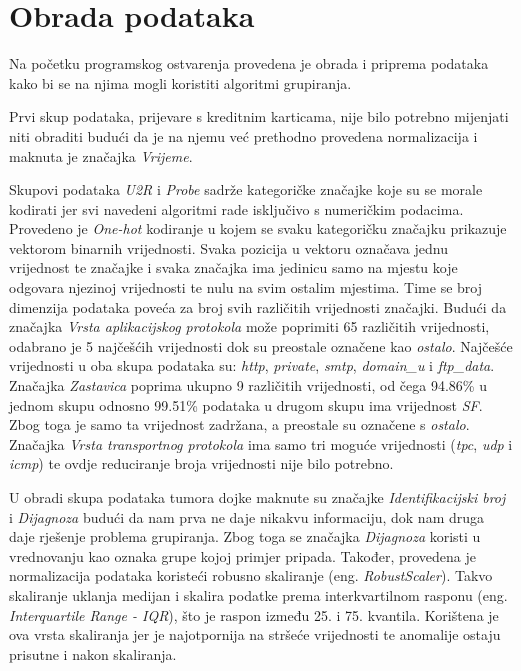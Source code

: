 \documentclass[utf8, diplomski, numeric]{fer}
\begin{document}
\section{Obrada podataka}
Na početku programskog ostvarenja provedena je obrada i priprema podataka kako bi se na njima mogli koristiti algoritmi grupiranja.

Prvi skup podataka, prijevare s kreditnim karticama, nije bilo potrebno mijenjati niti obraditi budući da je na njemu već prethodno provedena normalizacija i maknuta je značajka \textit{Vrijeme}. 

Skupovi podataka \textit{U2R} i \textit{Probe} sadrže kategoričke značajke koje su se morale kodirati jer svi navedeni algoritmi rade isključivo s numeričkim podacima. Provedeno je \textit{One-hot} kodiranje u kojem se svaku kategoričku značajku prikazuje vektorom binarnih vrijednosti. Svaka pozicija u vektoru označava jednu vrijednost te značajke i svaka značajka ima jedinicu samo na mjestu koje odgovara njezinoj vrijednosti te nulu na svim ostalim mjestima. Time se broj dimenzija podataka poveća za broj svih različitih vrijednosti značajki. Budući da značajka \textit{Vrsta aplikacijskog protokola} može poprimiti 65 različitih vrijednosti, odabrano je 5 najčešćih vrijednosti dok su preostale označene kao \textit{ostalo}. Najčešće vrijednosti u oba skupa podataka su: \textit{http}, \textit{private},  \textit{smtp}, \textit{domain\_u}  i \textit{ftp\_data}. Značajka \textit{Zastavica} poprima ukupno 9 različitih vrijednosti, od čega 94.86\% u jednom skupu odnosno 99.51\% podataka u drugom skupu ima vrijednost \textit{SF}. Zbog toga je samo ta vrijednost zadržana, a preostale su označene s \textit{ostalo}. Značajka \textit{Vrsta transportnog protokola} ima samo tri moguće vrijednosti (\textit{tpc}, \textit{udp} i \textit{icmp}) te ovdje reduciranje broja vrijednosti nije bilo potrebno.

U obradi skupa podataka tumora dojke maknute su značajke  \textit{Identifikacijski broj} i \textit{Dijagnoza} budući da nam prva ne daje nikakvu informaciju, dok nam druga daje rješenje problema grupiranja. Zbog toga se značajka \textit{Dijagnoza} koristi u vrednovanju kao oznaka grupe kojoj primjer pripada. Također, provedena je normalizacija podataka koristeći robusno skaliranje (eng. \textit{RobustScaler}). Takvo skaliranje uklanja medijan i skalira podatke prema interkvartilnom rasponu (eng. \textit{Interquartile Range - IQR}), što je raspon između 25. i 75. kvantila. Korištena je ova vrsta skaliranja jer je najotpornija na stršeće vrijednosti te anomalije ostaju prisutne i nakon skaliranja.
\end{document}

